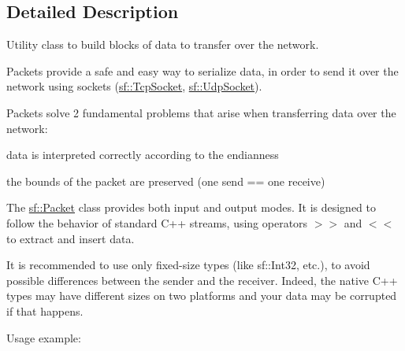 \subsection{Detailed Description}
Utility class to build blocks of data to transfer over the network. 

\begin{DoxyVerb}\end{DoxyVerb}


Packets provide a safe and easy way to serialize data, in order to send it over the network using sockets (\mbox{\hyperlink{classsf_1_1_tcp_socket}{sf\+::\+Tcp\+Socket}}, \mbox{\hyperlink{classsf_1_1_udp_socket}{sf\+::\+Udp\+Socket}}).

Packets solve 2 fundamental problems that arise when transferring data over the network\+: \begin{DoxyItemize}
\item data is interpreted correctly according to the endianness \item the bounds of the packet are preserved (one send == one receive)\end{DoxyItemize}
The \mbox{\hyperlink{classsf_1_1_packet}{sf\+::\+Packet}} class provides both input and output modes. It is designed to follow the behavior of standard C++ streams, using operators $>$$>$ and $<$$<$ to extract and insert data.

It is recommended to use only fixed-\/size types (like sf\+::\+Int32, etc.), to avoid possible differences between the sender and the receiver. Indeed, the native C++ types may have different sizes on two platforms and your data may be corrupted if that happens.

Usage example\+: 
\begin{DoxyCode}{0}
\DoxyCodeLine{}
\DoxyCodeLine{\textcolor{comment}{// Group the variables to send into a packet}}
\DoxyCodeLine{}
\DoxyCodeLine{\textcolor{comment}{// Send it over the network (socket is a valid sf::TcpSocket)}}
\DoxyCodeLine{}
\DoxyCodeLine{-----------------------------------------------------------------}
\DoxyCodeLine{}
\DoxyCodeLine{\textcolor{comment}{// Receive the packet at the other end}}
\DoxyCodeLine{}
\DoxyCodeLine{\textcolor{comment}{// Extract the variables contained in the packet}}
\DoxyCodeLine{\{}
\DoxyCodeLine{    \textcolor{comment}{// Data extracted successfully...}}
\DoxyCodeLine{\}}
\end{DoxyCode}



